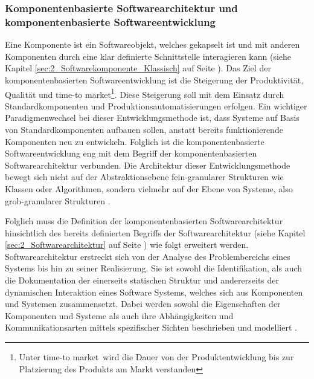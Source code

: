 \subsubsection{Komponentenbasierte Softwarearchitektur und komponentenbasierte Softwareentwicklung}
\label{sec:2_Komponentenbasierte_Softwarearchitektur}
Eine Komponente ist ein Softwareobjekt, welches gekapselt ist und mit anderen Komponenten durch eine klar definierte Schnittstelle interagieren kann (siehe Kapitel \ref{sec:2_Softwarekomponente_Klassisch} auf Seite \pageref{sec:2_Softwarekomponente_Klassisch}). Das Ziel der komponentenbasierten Softwareentwicklung ist die Steigerung der Produktivität, Qualität und \glqq time-to market\footnote{Unter \glqq time-to market\grqq\ wird die Dauer von der Produktentwicklung bis zur Platzierung des Produkts am Markt verstanden}\grqq . Diese Steigerung soll mit dem Einsatz durch Standardkomponenten und Produktionsautomatisierungen erfolgen. Ein wichtiger Paradigmenwechsel bei dieser Entwicklungsmethode ist, dass Systeme auf Basis von Standardkomponenten aufbauen sollen, anstatt bereits funktionierende Komponenten neu zu entwickeln. Folglich ist die komponentenbasierte Softwareentwicklung eng mit dem Begriff der komponentenbasierten Softwarearchitektur verbunden. Die Architektur dieser Entwicklungsmethode bewegt sich nicht auf der Abstraktionsebene fein-granularer Strukturen wie Klassen oder Algorithmen, sondern vielmehr auf der Ebene von Systeme, also grob-granularer Strukturen \citereset \autocite[siehe][S. 452-468]{Sommerville.2011}.

Folglich muss die Definition der komponentenbasierten Softwarearchitektur hinsichtlich des bereits definierten Begriffs der Softwarearchitektur (siehe Kapitel \ref{sec:2_Softwarearchitektur} auf Seite \pageref{sec:2_Softwarearchitektur}) wie folgt erweitert werden.
Softwarearchitektur erstreckt sich von der Analyse des Problembereichs eines Systems bis hin zu seiner Realisierung. Sie ist sowohl die Identifikation, als auch die Dokumentation der einerseits statischen Struktur und andererseits der dynamischen Interaktion eines Software Systems, welches sich aus Komponenten und Systemen zusammensetzt. Dabei werden sowohl die Eigenschaften der Komponenten und Systeme als auch ihre Abhängigkeiten und Kommunikationsarten mittels spezifischer Sichten beschrieben und modelliert \citereset \autocite[siehe][]{Andresen.2003}.


